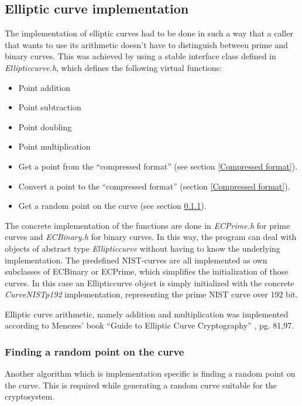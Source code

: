\documentclass[11pt,english]{article}
\begin{document}
\subsection{Elliptic curve implementation}
The implementation of elliptic curves had to be done in such a way that a caller that wants to use its arithmetic doesn't have to distinguish between prime and binary curves. This was achieved by using a stable interface class defined in \emph{Ellipticcurve.h}, which defines the following virtual functions:

\begin{itemize}
 \item Point addition
 \item Point subtraction
 \item Point doubling
 \item Point multiplication
 \item Get a point from the ``compressed format'' (see section \ref{Compressed format}).
 \item Convert a point to the ``compressed format'' (section \ref{Compressed format}).
 \item Get a random point on the curve (see section \ref{Finding a random point on the curve}).
\end{itemize}

The concrete implementation of the functions are done in \emph{ECPrime.h} for prime curves and \emph{ECBinary.h} for binary curves. In this way, the program can deal with objects of abstract type \emph{Ellipticcurve} without having to know the underlying implementation. The predefined NIST-curves are all implemented as own subclasses of ECBinary or ECPrime, which simplifies the initialization of those curves. In this case an Ellipticcurve object is simply initialized with the concrete \emph{CurveNISTp192} implementation, representing the prime NIST curve over 192 bit.

Elliptic curve arithmetic, namely addition and multiplication was implemented according to Menezes' book ``Guide to Elliptic Curve Cryptography'' \cite{940321}, pg. 81,97.

\subsubsection{Finding a random point on the curve}
\label{Finding a random point on the curve}
Another algorithm which is implementation specific is finding a random point on the curve. This is required while generating a random curve suitable for the cryptosystem.
\end{document}
